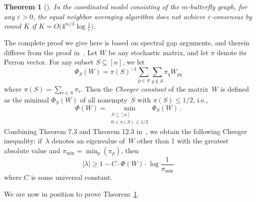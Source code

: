 \documentclass[a4paper]{article}
\theoremstyle{newthm}
\newtheorem{thm}{Theorem}
\renewcommand{\leq}{\leqslant}
\renewcommand{\geq}{\geqslant}
\begin{document}
\begin{thm}[\cite{OT11v1}]\label{thm:butterfly}
In the coordinated model consisting of  the $m$-butterfly graph, for any $\varepsilon >0$,
	the equal neighbor averaging algorithm does not achieve $\varepsilon$-consensus
	by round $K$ if $K = O\big( 4^{m/3}\log\frac{1}{\varepsilon} \big)$.
\end{thm}

The complete proof we give here is based on spectral gap arguments, and therein differes from the
        proof in~\cite{OT11v1}.
Let $W$ be any stochastic matrix, and let $\pi$ denote its Perron vector.
For any subset $S \subseteq [n]$, we let 
	\begin{equation*}\label{eq:def:bottleneck:set}
	\Phi_S(W) = \pi(S)^{-1} \sum_{p\in S} \sum_{q\notin S} \pi_q W_{pq}
	\end{equation*}
	where $\pi(S) = \sum_{r\in S} \pi_r$.
Then the {\em Cheeger constant\/} of the matrix~$W$ is defined as the minimal
	$\Phi_S(W)$ of all nonempty~$S$ with $\pi(S)\leq 1/2$, i.e.,
	\begin{equation*}\label{eq:def:bottleneck}
	\Phi(W) = \min_{\substack{S\subseteq[n]\\0<\pi(S)\leq1/2}} \Phi_S(W) \, .
	\end{equation*}
Combining Theorem 7.3 and Theorem 12.3 in~\cite{LPW09}, we obtain 
	the following Cheeger inequality: if~$\lambda$ denotes an
	eigenvalue of~$W$  other than 1 with the  greatest absolute value and $\pi_{\min}= \min_{p} ( \pi_p)$, then 
	\begin{equation}\label{eq:bottleneck}
	\lvert \lambda \rvert \geq
	1 - C\cdot \Phi(W) \cdot\log \frac{1}{\pi_{\min}}
	\end{equation}
	where $C$ is some universal constant.
	
\vspace{0.2cm}
We are now in position to prove Theorem~\ref{thm:butterfly}.
\end{document}
